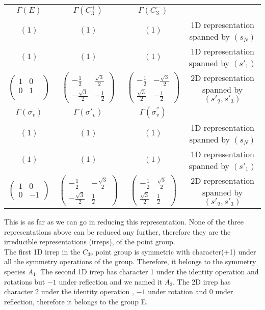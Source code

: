\documentclass[a4paper, 12pt, openany]{report}
\begin{document}
 \begin{table}[H]
 	\begin{tabular}{cccc}$\Gamma(E)$ & $\Gamma(C_3^+)$ & 
 		$\Gamma(C_3^-)$ &\\
 		$(1)$&$(1)$&$(1)$&1D representation spanned by $(s_N)$\\$(1)$&$(1)$&$(1)$&1D representation spanned by $(s'_1)$ \\	$\begin{pmatrix}
 		1&0&\\0&1&\\\end{pmatrix}$&$\begin{pmatrix}
 		-\frac{1}{2}&\frac{\sqrt{3}}{2}\\-{\frac{\sqrt{3}}{2}}&-\frac{1}{2}\end{pmatrix}$&$\begin{pmatrix}
 		-\frac{1}{2}&-\frac{\sqrt{3}}{2}\\\frac{\sqrt{3}}{2}&-\frac{1}{2}\end{pmatrix}$&2D representation spanned by $(s'_2, s'_3)$\\\linebreak[5cm]$ \Gamma(\sigma_v)$& $\Gamma(\sigma'_v)$&$ \Gamma(\sigma_v^{''})$&\\	$(1)$&$(1)$&$(1)$&1D representation spanned by $(s_N)$\\
 		$(1)$&$(1)$&$(1)$&1D representation spanned by $(s'_1)$\\
 $\begin{pmatrix}
 1&0\\0&-1\end{pmatrix}
 $&$\begin{pmatrix}
 -\frac{1}{2}&-\frac{\sqrt{3}}{2}\\-{\frac{\sqrt{3}}{2}}&\frac{1}{2}\end{pmatrix}
 $&$ \begin{pmatrix}
 -\frac{1}{2}&\frac{\sqrt{3}}{2}\\{\frac{\sqrt{3}}{2}}&\frac{1}{2}\end{pmatrix}$
 &2D representation spanned by $(s'_2, s'_3)$
 \end{tabular}\end{table}
 This is as far as we can go in reducing this representation. None of the three representations above can be
 reduced any further, therefore they are the irreducible representations (irreps), of the  point group.\\
 The first 1D irrep in the $C_{3v}$ point group is symmetric with character(+1) under all the symmetry operations of the group. Therefore, it belongs to the symmetry species $A_1$. The second 1D irrep has character 1 under the identity operation and rotations but $-1$ under reflection and we named it $A_2$. The 2D irrep has character 2 under the identity operation , $-1$ under rotation and $0$ under reflection, therefore it belongs to the group E.\\
\end{document}
